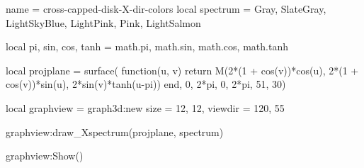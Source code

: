 \documentclass{standalone}
\begin{document}
\begin{luadraw}{name = cross-capped-disk-X-dir-colors}
local spectrum = {Gray, SlateGray, LightSkyBlue, LightPink, Pink, LightSalmon}

local pi, sin, cos, tanh = math.pi, math.sin, math.cos, math.tanh

local projplane = surface(
  function(u, v)
    return M(2*(1 + cos(v))*cos(u), 2*(1 + cos(v))*sin(u), 2*sin(v)*tanh(u-pi))
  end,
  0, 2*pi, 0,  2*pi,
  {51, 30})

local graphview = graph3d:new{
  size    = {12, 12},
  viewdir = {120, 55}
}

graphview:draw_Xspectrum(projplane, spectrum)

graphview:Show()
\end{luadraw}
\end{document}
